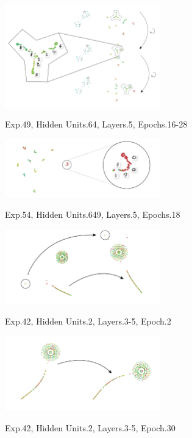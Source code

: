 \documentclass[a4paper,11pt,titlepage]{article}
\begin{document}
	\begin{figure}[H]
    			\centering	
			{{\includegraphics[width=0.6\textwidth]
    				{img/conc_X49_H64_L5_E16-28.png} 
    			}}%
    			\caption{Exp.49, Hidden Units.64, Layers.5, Epochs.16-28}%
    		\label{fig:mnistHinton}
	\end{figure}

	\begin{figure}[H]
    			\centering	
			{{\includegraphics[width=0.6\textwidth]
    				{img/conc_X54_H649_L5_E18.png} 
    			}}%
    			\caption{Exp.54, Hidden Units.649, Layers.5, Epochs.18}%
    		\label{fig:mnistHinton}
	\end{figure}
	
	\begin{figure}[H]
    			\centering	
			{{\includegraphics[width=0.6\textwidth]
    				{img/conc-X42_H2_L3-5_E2.png} 
    			}}%
    			\caption{Exp.42, Hidden Units.2, Layers.3-5, Epoch.2}%
    		\label{fig:mnistHinton}
	\end{figure}
	
	\begin{figure}[H]
    			\centering	
			{{\includegraphics[width=0.6\textwidth]
    				{img/conc-X42_H2_L3-5_E30.png} 
    			}}%
    			\caption{Exp.42, Hidden Units.2, Layers.3-5, Epoch.30}%
    		\label{fig:mnistHinton}
	\end{figure}
\end{document}

